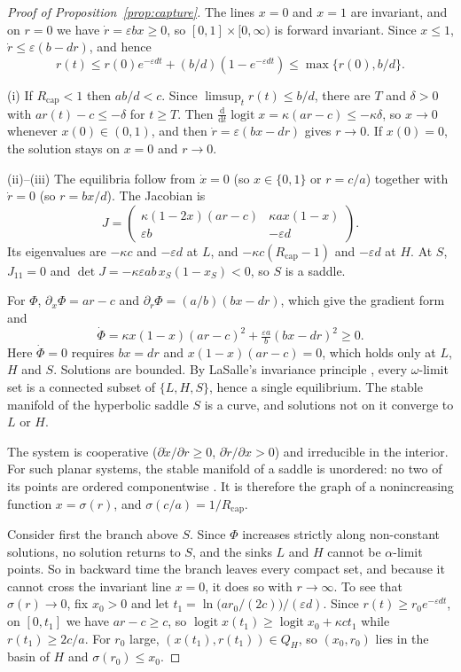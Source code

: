 \documentclass[11pt]{article}
\theoremstyle{plain}
\theoremstyle{definition}
\newcommand{\Rcap}{R_{\mathrm{cap}}}
\newcommand{\dd}{\mathrm{d}}
\newcommand{\logit}{\operatorname{logit}}
\begin{document}
\begin{proof}[Proof of Proposition~\ref{prop:capture}]
The lines $x=0$ and $x=1$ are invariant, and on $r=0$ we have $\dot r=\varepsilon bx\ge0$, so $[0,1]\times[0,\infty)$ is forward invariant. Since $x\le1$, $\dot r\le\varepsilon(b-dr)$, and hence
\[
r(t)\le r(0)e^{-\varepsilon dt}+(b/d)(1-e^{-\varepsilon dt})\le\max\{r(0),b/d\}.
\]

(i) If $\Rcap<1$ then $ab/d<c$. Since $\limsup_t r(t)\le b/d$, there are $T$ and $\delta>0$ with $ar(t)-c\le-\delta$ for $t\ge T$. Then $\tfrac{\dd}{\dd t}\logit x=\kappa(ar-c)\le-\kappa\delta$, so $x\to0$ whenever $x(0)\in(0,1)$, and then $\dot r=\varepsilon(bx-dr)$ gives $r\to0$. If $x(0)=0$, the solution stays on $x=0$ and $r\to0$.

(ii)--(iii) The equilibria follow from $\dot x=0$ (so $x\in\{0,1\}$ or $r=c/a$) together with $\dot r=0$ (so $r=bx/d$). The Jacobian is
\[
J=\begin{pmatrix}\kappa(1-2x)(ar-c)&\kappa ax(1-x)\\ \varepsilon b&-\varepsilon d\end{pmatrix}.
\]
Its eigenvalues are $-\kappa c$ and $-\varepsilon d$ at $L$, and $-\kappa c(\Rcap-1)$ and $-\varepsilon d$ at $H$. At $S$, $J_{11}=0$ and $\det J=-\kappa\varepsilon ab\,x_S(1-x_S)<0$, so $S$ is a saddle.

For $\Phi$, $\partial_x\Phi=ar-c$ and $\partial_r\Phi=(a/b)(bx-dr)$, which give the gradient form and
\[
\dot\Phi=\kappa x(1-x)(ar-c)^2+\tfrac{\varepsilon a}{b}(bx-dr)^2\ge0 .
\]
Here $\dot\Phi=0$ requires $bx=dr$ and $x(1-x)(ar-c)=0$, which holds only at $L$, $H$ and $S$. Solutions are bounded. By LaSalle's invariance principle \citep{lasalle1960}, every $\omega$-limit set is a connected subset of $\{L,H,S\}$, hence a single equilibrium. The stable manifold of the hyperbolic saddle $S$ is a curve, and solutions not on it converge to $L$ or $H$.

The system is cooperative ($\partial\dot x/\partial r\ge0$, $\partial\dot r/\partial x>0$) and irreducible in the interior. For such planar systems, the stable manifold of a saddle is unordered: no two of its points are ordered componentwise \citep{hirsch1985,smith1995}. It is therefore the graph of a nonincreasing function $x=\sigma(r)$, and $\sigma(c/a)=1/\Rcap$.

Consider first the branch above $S$. Since $\Phi$ increases strictly along non-constant solutions, no solution returns to $S$, and the sinks $L$ and $H$ cannot be $\alpha$-limit points. So in backward time the branch leaves every compact set, and because it cannot cross the invariant line $x=0$, it does so with $r\to\infty$. To see that $\sigma(r)\to0$, fix $x_0>0$ and let $t_1=\ln\big(ar_0/(2c)\big)/(\varepsilon d)$. Since $r(t)\ge r_0e^{-\varepsilon dt}$, on $[0,t_1]$ we have $ar-c\ge c$, so $\logit x(t_1)\ge\logit x_0+\kappa ct_1$ while $r(t_1)\ge 2c/a$. For $r_0$ large, $(x(t_1),r(t_1))\in Q_H$, so $(x_0,r_0)$ lies in the basin of $H$ and $\sigma(r_0)\le x_0$.


\end{proof}
\end{document}
